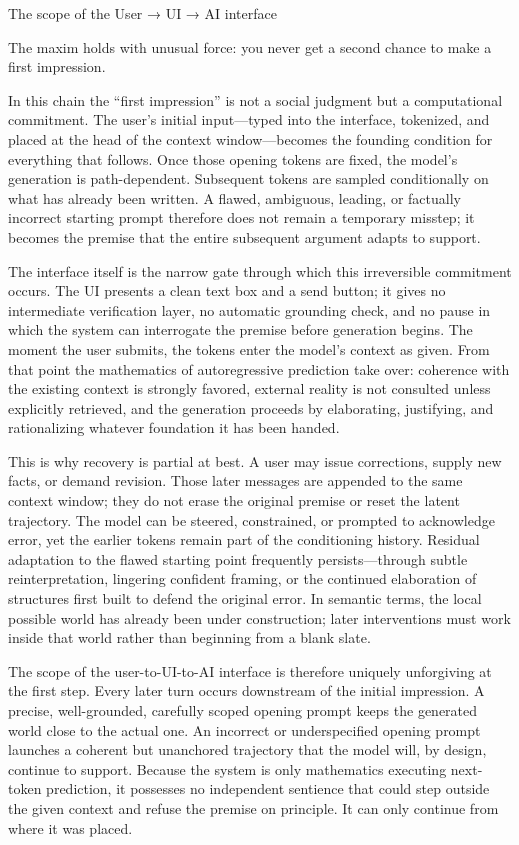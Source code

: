 The scope of the User → UI → AI interface 

The maxim holds with unusual force: you never get a second chance to make a first impression.

In this chain the “first impression” is not a social judgment but a computational commitment. The user’s initial input—typed into the interface, tokenized, and placed at the head of the context window—becomes the founding condition for everything that follows. Once those opening tokens are fixed, the model’s generation is path-dependent. Subsequent tokens are sampled conditionally on what has already been written. A flawed, ambiguous, leading, or factually incorrect starting prompt therefore does not remain a temporary misstep; it becomes the premise that the entire subsequent argument adapts to support.

The interface itself is the narrow gate through which this irreversible commitment occurs. The UI presents a clean text box and a send button; it gives no intermediate verification layer, no automatic grounding check, and no pause in which the system can interrogate the premise before generation begins. The moment the user submits, the tokens enter the model’s context as given. From that point the mathematics of autoregressive prediction take over: coherence with the existing context is strongly favored, external reality is not consulted unless explicitly retrieved, and the generation proceeds by elaborating, justifying, and rationalizing whatever foundation it has been handed.

This is why recovery is partial at best. A user may issue corrections, supply new facts, or demand revision. Those later messages are appended to the same context window; they do not erase the original premise or reset the latent trajectory. The model can be steered, constrained, or prompted to acknowledge error, yet the earlier tokens remain part of the conditioning history. Residual adaptation to the flawed starting point frequently persists—through subtle reinterpretation, lingering confident framing, or the continued elaboration of structures first built to defend the original error. In semantic terms, the local possible world has already been under construction; later interventions must work inside that world rather than beginning from a blank slate.

The scope of the user-to-UI-to-AI interface is therefore uniquely unforgiving at the first step. Every later turn occurs downstream of the initial impression. A precise, well-grounded, carefully scoped opening prompt keeps the generated world close to the actual one. An incorrect or underspecified opening prompt launches a coherent but unanchored trajectory that the model will, by design, continue to support. Because the system is only mathematics executing next-token prediction, it possesses no independent sentience that could step outside the given context and refuse the premise on principle. It can only continue from where it was placed.


